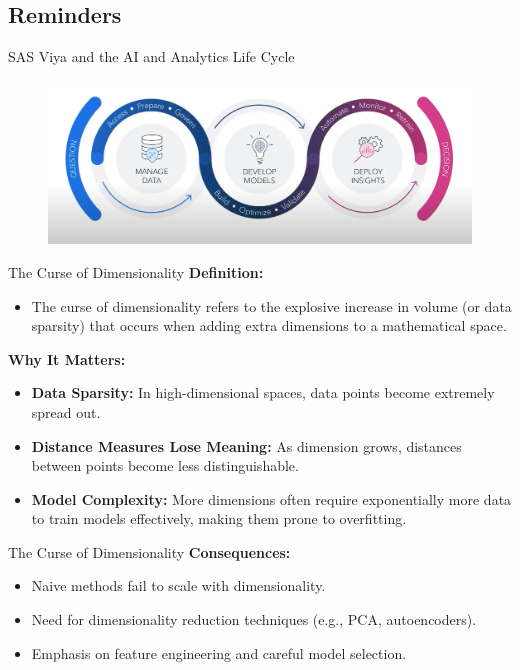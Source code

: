 \subsection{Reminders}

\begin{frame}[fragile]{SAS Viya and the AI and Analytics Life Cycle}

\begin{figure}[H]
    \centering
    \includegraphics[width=1\linewidth]{Images/life_cycle.png}
\end{figure}


\end{frame}


\begin{frame}[fragile]{The Curse of Dimensionality}
\textbf{Definition:} 
\begin{itemize}
    \item The curse of dimensionality refers to the explosive increase in volume
    (or data sparsity) that occurs when adding extra dimensions to a mathematical space.
\end{itemize}

\vfill

\textbf{Why It Matters:}
\begin{itemize}
    \item \textbf{Data Sparsity:} In high-dimensional spaces, data points become extremely spread out.
    \item \textbf{Distance Measures Lose Meaning:} As dimension grows, distances between points become less distinguishable.
    \item \textbf{Model Complexity:} More dimensions often require exponentially more data to train models effectively, making them prone to overfitting.
\end{itemize}
\end{frame}

\begin{frame}[fragile]{The Curse of Dimensionality}
\textbf{Consequences:}
\begin{itemize}
    \item Naive methods fail to scale with dimensionality.
    \item Need for dimensionality reduction techniques (e.g., PCA, autoencoders).
    \item Emphasis on feature engineering and careful model selection.
\end{itemize}
\end{frame}

